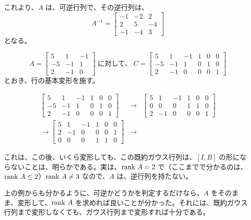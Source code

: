 \begin{eg}
これより、$A$ は、可逆行列で、その逆行列は、
$$A^{-1} = \left[\begin{array}{ccc} -1 & -2 & 2 \\  2 & 5 & -4 \\ -1 & -4 & 3 \end{array}\right]$$
となる。
\end{eg}

\begin{eg}
$$A = \left[\begin{array}{ccc} 5 & 1 & -1 \\ -5 & -1 & 1 \\ 2 & -1 & 0 \end{array}\right] 
\;\mbox{に対して、}\; 
C = \left[\begin{array}{cccccc}5 & 1 & -1 & 1 & 0 & 0 \\ -5 & -1 & 1 & 0 & 1 & 0 \\ 2 & -1 & 0 & 0 & 0 & 1 \end{array}\right]$$
とおき、行の基本変形を施す。

\begin{eqnarray*}
\left[\begin{array}{cccccc}5 & 1 & -1 & 1 & 0 & 0 \\ -5 & -1 & 1 & 0 & 1 & 0 \\ 2 & -1 & 0 & 0 & 0 & 1 \end{array}\right] & \longrightarrow &\left[\begin{array}{cccccc}5 & 1 & -1 & 1 & 0 & 0 \\ 0 & 0 & 0 & 1 & 1 & 0 \\ 2 & -1 & 0 & 0 & 0 & 1 \end{array}\right]\\
\longrightarrow \left[\begin{array}{cccccc}5 & 1 & -1 & 1 & 0 & 0  \\ 2 & -1 & 0 & 0 & 0 & 1 \\ 0 & 0 & 0 & 1 & 1 & 0\end{array}\right]& \longrightarrow & 
\end{eqnarray*}

これは、この後、いくら変形しても、この既約ガウス行列は、$[I, B]$ の形にならないことは、明らかである。実は、$\mbox{{\rm rank }} A = 2$ で（ここまでで分かるのは、$\mbox{{\rm rank }} A\leq 2$）$\mbox{{\rm rank }} A \neq 3$ なので、$A$ は、逆行列を持たない。
\end{eg}

上の例からも分かるように、可逆かどうかを判定するだけなら、$A$ をそのまま、変形して、$\mbox{{\rm rank }} A$ を求めれば良いことが分かった。それには、既約ガウス行列まで変形しなくても、ガウス行列まで変形すれば十分である。

